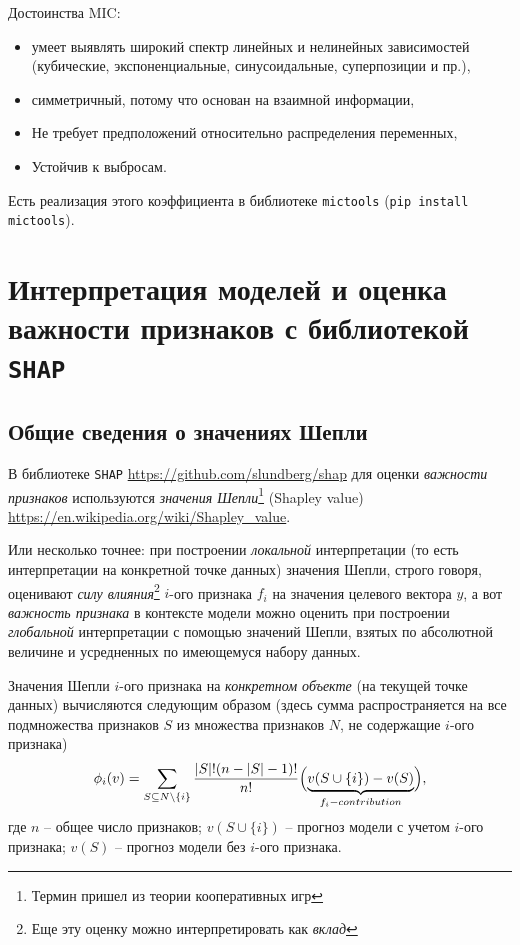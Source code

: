 \documentclass[%
	11pt,
	a4paper,
	utf8,
		]{article}
\begin{document}
Достоинства MIC:
\begin{itemize}
	\item умеет выявлять широкий спектр линейных и нелинейных зависимостей (кубические, экспоненциальные, синусоидальные, суперпозиции и пр.),
	
	\item симметричный, потому что основан на взаимной информации,
	
	\item Не требует предположений относительно распределения переменных,
	
	\item Устойчив к выбросам.
\end{itemize}

Есть реализация этого коэффициента в библиотеке \texttt{mictools} (\verb|pip install mictools|).




\section{Интерпретация моделей и оценка важности признаков с библиотекой \texttt{SHAP}}

\subsection{Общие сведения о значениях Шепли}

В библиотеке \texttt{SHAP} \url{https://github.com/slundberg/shap} для оценки \emph{важности признаков} используются \emph{значения Шепли}\footnote{Термин пришел из теории кооперативных игр} (Shapley value) \url{https://en.wikipedia.org/wiki/Shapley_value}.

Или несколько точнее: при построении \emph{локальной} интерпретации (то есть интерпретации на конкретной точке данных) значения Шепли, строго говоря, оценивают \emph{силу влияния}\footnote{Еще эту оценку можно интерпретировать как \emph{вклад}} $ i $-ого признака $ f_i $ на значения целевого вектора $ y $, а вот \emph{важность признака} в контексте модели можно оценить при построении \emph{глобальной} интерпретации с помощью значений Шепли, взятых по абсолютной величине и усредненных по имеющемуся набору данных. 


Значения Шепли $i$-ого признака на \emph{конкретном объекте} (на текущей точке данных) вычисляются следующим образом (здесь сумма распространяется на все подмножества признаков $ S $ из множества признаков $ N $, не содержащие $ i $-ого признака)
\begin{align*}
\phi_i(v) = \sum_{S \subseteq N\setminus\{i\}} \dfrac{|S|!(n - |S| - 1)!}{n!}\Bigl( \underset{f_i-contribution }{\underbrace{ v(S \cup \{i\}) - v(S)}} \Bigr),
\end{align*}
где $ n $ -- общее число признаков; $ v(S \cup \{i\}) $ -- прогноз модели с учетом $ i $-ого признака; $ v(S) $ -- прогноз модели без $ i $-ого признака.
\end{document}
